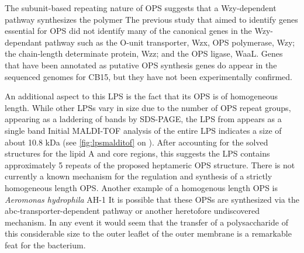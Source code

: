 
The subunit-based repeating nature of \caulobacter{} \ac{OPS} suggests that a Wzy-dependent pathway
synthesizes the polymer The previous study that aimed to identify genes
essential for \ac{OPS} did not identify many of the canonical genes in the Wzy-dependant
pathway such as the O-unit transporter, Wzx, \ac{OPS} polymerase, Wzy; the
chain-length determinate protein, Wzz; and the \ac{OPS} ligase, WaaL. Genes that have been
annotated as putative \ac{OPS} synthesis genes do appear in the sequenced genomes for \caulobacter
CB15, but they have not been experimentally confirmed.

An additional aspect to this \ac{LPS} is the fact that its \ac{OPS} is of homogeneous length. While
other \ac{LPS}s vary in size due to the number of \ac{OPS} repeat groups, appearing as a laddering
of bands by \ac{SDS-PAGE}, the \ac{LPS} from \caulobacter appears as a single
band Initial \ac{MALDI-TOF} analysis of the entire \ac{LPS} indicates a size of
about 10.8 kDa (see \cref{fig:lpsmalditof} on ).  After accounting for the
solved structures for the lipid A and core regions, this suggests the \ac{LPS} contains
approximately 5 repeats of the proposed heptameric \ac{OPS} structure.  There is not currently a
known mechanism for the regulation and synthesis of a strictly homogeneous length \ac{OPS}. Another example of a homogenous length \ac{OPS} is \textit{Aeromonas hydrophila} AH-1
It is possible that these \acp{OPS} are synthesized via the \ac{abc}-transporter-dependent
pathway or another heretofore undiscovered mechanism. In any event it would seem
that the transfer of a polysaccharide of this considerable size to the outer leaflet of the outer
membrane is a remarkable feat for the bacterium.

